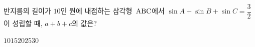 반지름의 길이가 $10$인 원에 내접하는 삼각형~$\mathrm{ABC}$에서 $\sin A+\sin B+\sin C=\dfrac{3}{2}$이 성립할 때, $a+b+c$의 값은?
\begin{choices32}{$10$}{$15$}{$20$}{$25$}{$30$}\end{choices32}
